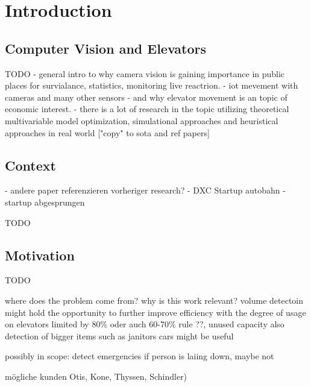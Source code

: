 \chapter{Introduction}
\label{chap:intro}

\section{Computer Vision and Elevators}


\autocite{reddy2013foreground}

TODO
- general intro to why camera vision is gaining importance in public places for survialance, statistics, monitoring live reactrion. 
- iot mevement with cameras and many other sensors
- and why elevator movement is an topic of economic interest.
- there is a lot of research in the topic utilizing theoretical multivariable model optimization, simulational approaches and heuristical approaches in real world ["copy" to sota and ref papers]


\section{Context}

- andere paper referenzieren vorheriger research?
- DXC Startup autobahn 
- startup abgesprungen

TODO

\section{Motivation}


TODO

where does the problem come from?
why is this work relevant?
volume detectoin might hold the opportunity to further improve efficiency with the degree of usage on elevators
limited by 80\% oder auch 60-70\% rule ??, unused capacity
also detection of bigger items such as janitors cars might be useful

possibly in scope: detect emergencies if person is laiing down, maybe not

mögliche kunden Otis, Kone, Thyssen, Schindler)


